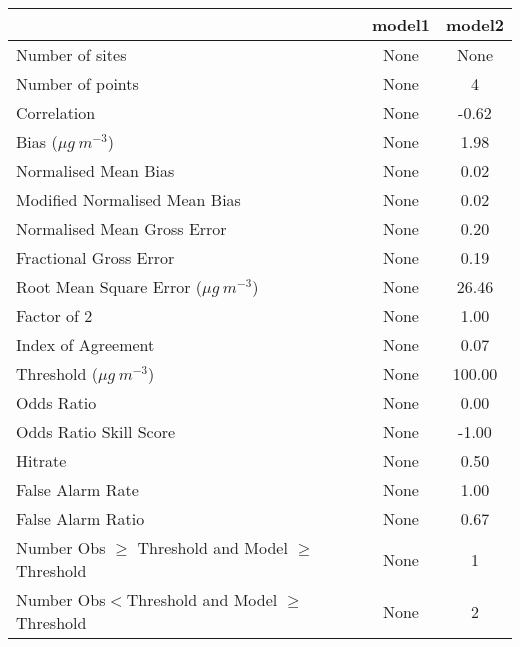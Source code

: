 \begin{table}
  \begin{center}
    \begin{tabular}{|l|c|c|} \hline
 & \textbf{model1}  & \textbf{model2} \\ \hline 
 Number of sites                               &      None &      None \\  \hline
 Number of points                              &      None &         4 \\  \hline
 Correlation                                   &      None &     -0.62 \\  \hline
 Bias ($\mu g\ m^{-3}$)                        &      None &      1.98 \\  \hline
 Normalised Mean Bias                          &      None &      0.02 \\  \hline
 Modified Normalised Mean Bias                 &      None &      0.02 \\  \hline
 Normalised Mean Gross Error                   &      None &      0.20 \\  \hline
 Fractional Gross Error                        &      None &      0.19 \\  \hline
 Root Mean Square Error ($\mu g\ m^{-3}$)      &      None &     26.46 \\  \hline
 Factor of 2                                   &      None &      1.00 \\  \hline
 Index of Agreement                            &      None &      0.07 \\  \hline
 Threshold ($\mu g\ m^{-3}$)                   &      None &    100.00 \\  \hline
 Odds Ratio                                    &      None &      0.00 \\  \hline
 Odds Ratio Skill Score                        &      None &     -1.00 \\  \hline
 Hitrate                                       &      None &      0.50 \\  \hline
 False Alarm Rate                              &      None &      1.00 \\  \hline
 False Alarm Ratio                             &      None &      0.67 \\  \hline
 Number Obs $\geq$ Threshold and Model $\geq$ Threshold &      None &         1 \\  \hline
 Number Obs$<$Threshold and Model $\geq$ Threshold &      None &         2 \\  \hline

\end{tabular}
\end{center}
\end{table}
